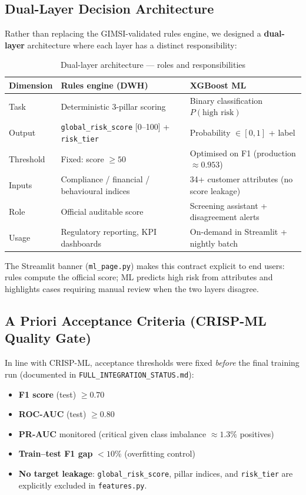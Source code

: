 \subsection{Dual-Layer Decision Architecture}

Rather than replacing the GIMSI-validated rules engine, we designed a
\textbf{dual-layer} architecture where each layer has a distinct responsibility:

\begin{table}[H]
\centering
\caption{Dual-layer architecture --- roles and responsibilities}
\label{tab:dual-layer-roles}
\begin{tabular}{|l|p{5.2cm}|p{5.2cm}|}
\hline
\textbf{Dimension} & \textbf{Rules engine (DWH)} & \textbf{XGBoost ML} \\
\hline
Task & Deterministic 3-pillar scoring & Binary classification $P(\text{high risk})$ \\
Output & \texttt{global\_risk\_score} [0--100] + \texttt{risk\_tier} & Probability $\in [0,1]$ + label \\
Threshold & Fixed: score $\geq 50$ & Optimised on F1 (production $\approx 0.953$) \\
Inputs & Compliance / financial / behavioural indices & 34+ customer attributes (no score leakage) \\
Role & Official auditable score & Screening assistant + disagreement alerts \\
Usage & Regulatory reporting, KPI dashboards & On-demand in Streamlit + nightly batch \\
\hline
\end{tabular}
\end{table}

The Streamlit banner (\texttt{ml\_page.py}) makes this contract explicit to end
users: rules compute the official score; ML predicts high risk from attributes and
highlights cases requiring manual review when the two layers disagree.

\subsection{A Priori Acceptance Criteria (CRISP-ML Quality Gate)}

In line with CRISP-ML, acceptance thresholds were fixed \emph{before} the final
training run (documented in \texttt{FULL\_INTEGRATION\_STATUS.md}):
\begin{itemize}
    \item \textbf{F1 score} (test) $\geq 0.70$
    \item \textbf{ROC-AUC} (test) $\geq 0.80$
    \item \textbf{PR-AUC} monitored (critical given class imbalance $\approx 1.3\%$ positives)
    \item \textbf{Train--test F1 gap} $< 10\%$ (overfitting control)
    \item \textbf{No target leakage}: \texttt{global\_risk\_score}, pillar indices,
          and \texttt{risk\_tier} are explicitly excluded in
          \texttt{features.py}.
\end{itemize}

